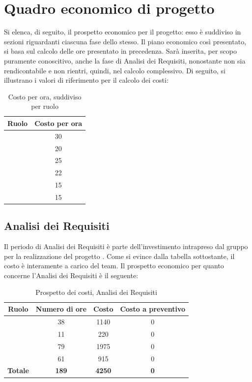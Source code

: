 \newpage

\section{Quadro economico di progetto}
Si elenca, di seguito, il prospetto economico per il progetto: esso è suddiviso in sezioni riguardanti ciascuna fase dello stesso. Il piano economico così presentato, si basa sul calcolo delle ore presentato in precedenza. Sarà inserita, per scopo puramente conoscitivo, anche la fase di Analisi dei Requisiti, nonostante non sia rendicontabile e non rientri, quindi, nel calcolo complessivo. Di seguito, si illustrano i valori di riferimento per il calcolo dei costi:

\begin{table}[H]
	\begin{center}
		\begin{tabular}{|c|c|}
			\hline
			\textbf{Ruolo}	& \textbf{Costo per ora} \\
			\hline
			\Res	&	30	\\
			\hline
			\Amm	&	20	\\
			\hline
			\Ana	&	25	\\
			\hline
			\Prog	&	22	\\
			\hline
			\Progr	&	15	\\
			\hline
			\Ver	&	15	\\
			\hline
		\end{tabular}
	\end{center}
	\caption{Costo per ora, suddiviso per ruolo}
\end{table}

\newpage
\subsection{Analisi dei Requisiti}

Il periodo di Analisi dei Requisiti è parte dell'investimento intrapreso dal gruppo \textit{\gruppo} per la realizzazione del progetto \progetto. Come si evince dalla tabella sottostante, il costo è interamente a carico del team. Il prospetto economico per quanto concerne l'Analisi dei Requisiti è il seguente:


\begin{table}[H]
	\begin{center}
		\begin{tabular}{|c|c|c|c|}
			\hline
			\textbf{Ruolo}	& \textbf{Numero di ore} & \textbf{Costo} & \textbf{Costo a preventivo} \\
			\hline
			\Res	&	38  &	1140 &  0	\\
			\hline
			\Amm	&	11  &	220  &  0	\\
			\hline
			\Ana	&	79  &	1975 &  0	\\
			\hline
			\Ver	&	61  &	915 &  0	\\
			\hline
			\textbf{Totale}  &	\textbf{189}	& \textbf{4250}  &  \textbf{0}	\\
			\hline
		\end{tabular}
	\end{center}
	\caption{Prospetto dei costi, Analisi dei Requisiti }
\end{table}

